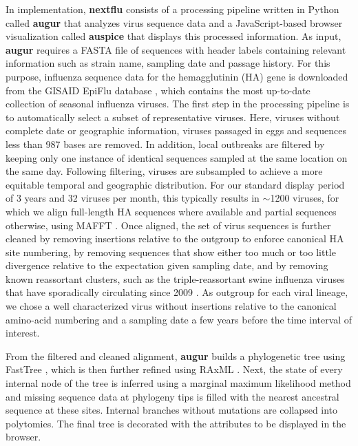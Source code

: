 \documentclass{bioinfo}
\newcommand{\augur}{\textbf{augur}}
\newcommand{\auspice}{\textbf{auspice}}
\newcommand{\nextflu}{\textbf{nextflu}}
\begin{document}
In implementation, \nextflu{} consists of a processing pipeline written in Python called \augur{} that analyzes virus sequence data and a JavaScript-based browser visualization called \auspice{} that displays this processed information.
As input, \augur{} requires a FASTA file of sequences with header labels containing relevant information such as strain name, sampling date and passage history.
For this purpose, influenza sequence data for the hemagglutinin (HA) gene is downloaded from the GISAID EpiFlu database \citep{GISAID}, which contains the most up-to-date collection of seasonal influenza viruses.
The first step in the processing pipeline is to automatically select a subset of representative viruses.
Here, viruses without complete date or geographic information, viruses passaged in eggs and sequences less than 987 bases are removed.
In addition, local outbreaks are filtered by keeping only one instance of identical sequences sampled at the same location on the same day.
Following filtering, viruses are subsampled to achieve a more equitable temporal and geographic distribution.
For our standard display period of 3 years and 32 viruses per month, this typically results in $\sim$1200 viruses, for which we align full-length HA sequences where available and partial sequences otherwise, using MAFFT \citep{katoh_mafft_2013}.
Once aligned, the set of virus sequences is further cleaned by removing insertions relative to the outgroup to enforce canonical HA site numbering, by removing sequences that show either too much or too little divergence relative to the expectation given sampling date, and by removing known reassortant clusters, such as the triple-reassortant swine influenza viruses that have sporadically circulating since 2009 \citep{bastien_human_2010}. As outgroup for each viral lineage, we chose a well characterized virus without insertions relative to the canonical amino-acid numbering and a sampling date a few years before the time interval of interest.

From the filtered and cleaned alignment, \augur{} builds a phylogenetic tree using FastTree \citep{price_fasttree_2009}, which is then further refined using RAxML \citep{stamatakis_raxml_2014}.
Next, the state of every internal node of the tree is inferred using a marginal maximum likelihood method and missing sequence data at phylogeny tips is filled with the nearest ancestral sequence at these sites.
Internal branches without mutations are collapsed into polytomies.
The final tree is decorated with the attributes to be displayed in the browser.
\end{document}
